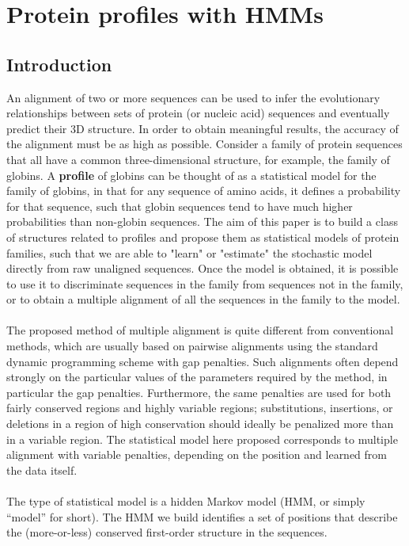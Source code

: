 \graphicspath{{chapters/images/}}
\chapter{Protein profiles with HMMs}

\section{Introduction}
An alignment of two or more sequences can be used to infer the evolutionary relationships between sets of protein (or nucleic acid) sequences and eventually predict their 3D structure. 
In order to obtain meaningful results, the accuracy of the alignment must be as high as possible.
Consider a family of protein sequences that all have a common three-dimensional structure, for example, the family of globins. A \textbf{profile} of globins can be thought of as a statistical model for the family of globins, in that for any sequence of amino acids, it defines a probability for that sequence, such that globin sequences tend to have much higher probabilities than non-globin sequences.
The aim of this paper is to build a class of structures related to profiles and propose them as statistical models of protein families, such that we are able to "learn" or "estimate" the stochastic model directly from raw unaligned sequences.
Once the model is obtained, it is possible to use it to discriminate sequences in the family from sequences not in the family, or to obtain a multiple alignment of all the sequences in the family to the model.
\\
\\
\noindent
The proposed method of multiple alignment is quite different from conventional methods, which are usually based on pairwise alignments using the standard dynamic programming scheme with gap penalties. 
Such alignments often depend strongly on the particular values of the parameters required by the method, in particular the gap penalties. Furthermore, the same penalties are used for both fairly conserved regions and highly variable regions; substitutions, insertions, or deletions in a region of high conservation should ideally be penalized more than in a variable region.  The statistical model here proposed corresponds to multiple alignment with variable penalties, depending on the position and learned from the data itself. 
\\
\\
\noindent
The type of statistical model is a hidden Markov model (HMM, or simply “model” for short). The HMM we build identifies a set of positions that describe the (more-or-less) conserved first-order structure in the sequences. 

